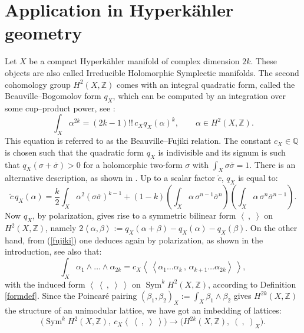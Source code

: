 \documentclass{amsart}
\DeclareMathOperator{\Sym}{Sym}
\newcommand{\coloneqq}{:=}
\newcommand{\bra}{\left<\!\!\!\:\left<}
\newcommand{\ket}{\right>\!\!\!\:\right>}
\newcommand{\Q}{\mathbb{Q}}
\newcommand{\Z}{\mathbb{Z}}
\theoremstyle{plain}
\theoremstyle{definition}
\theoremstyle{remark}
\begin{document}
\section{Application in Hyperk\"ahler geometry} \label{hyper}
Let $X$ be a compact Hyperk\"ahler manifold of complex dimension $2k$. These objects are also called Irreducible Holomorphic Symplectic manifolds. The second cohomology group $H^2(X,\Z)$ comes with an integral quadratic form, called the Beauville--Bogomolov form $q_X$, which can be computed by an integration over some cup--product power, see \cite[Subsection~2.3]{OGrady}:
\begin{equation} \label{fujiki}
\int_X \alpha ^{2k} = (2k-1)!!\,c_X q_X(\alpha)^k,\qquad \alpha\in H^2(X,\Z).
\end{equation}
This equation is referred to as the Beauville--Fujiki relation. The constant $c_X\in\Q$ is chosen such that the quadratic form $q_X$ is indivisible and its signum is such that $q_X(\sigma + \bar{\sigma}) > 0$ for a holomorphic two-form $\sigma$ with $\int_X\sigma\bar{\sigma} = 1$. There is an alternative description, as shown in \cite[Chap.~23]{Huybrechts}. Up to a scalar factor $\tilde{c}$, $q_X$ is equal to:
\begin{equation}\label{bb}
 \tilde{c}\,q_X(\alpha) = \frac{k}{2}\int_X \alpha^2 (\sigma\bar{\sigma})^{k-1} + (1-k)\left(\int_X\alpha\,\sigma^{n-1}\bar{\sigma}^{n}\right)\left(\int_X\alpha\,\sigma^{n}\bar{\sigma}^{n-1}\right).
\end{equation}
Now $q_X$, by polarization, gives rise to a symmetric bilinear form $\left<\ ,\;\right>$ on $H^2(X,\Z)$, namely $2\left<\alpha,\beta\right> \coloneqq q_X(\alpha+\beta)-q_X(\alpha) -q_X(\beta)$. On the other hand, from (\ref{fujiki}) one deduces again by polarization, as shown in the introduction, see also \cite[Eq.~3.2.4]{OGrady} that:
\begin{equation}
 \int_X \alpha_1\wedge\ldots\wedge\alpha_{2k} = c_X \bra \alpha_1\ldots\alpha_k\,,\,\alpha_{k+1}\ldots\alpha_{2k}\ket,
\end{equation}
with the induced form $\bra\ ,\;\ket$ on $\Sym^kH^2(X,\Z)$, according to Definition \ref{formdef}. Since the Poincar\'e pairing $(\beta_1,\beta_2)_X \coloneqq \int_X\beta_1\wedge\beta_2$ gives $H^{2k}(X,\Z)$ the structure of an unimodular lattice, we have got an imbedding of lattices:
\begin{equation}
\Big( \Sym^kH^2(X,\Z),\: c_X\!\bra\ ,\;\ket\Big) \longrightarrow \Big(H^{2k}(X,\Z),\;(\ ,\;)_X\Big).
\end{equation}
\end{document}
